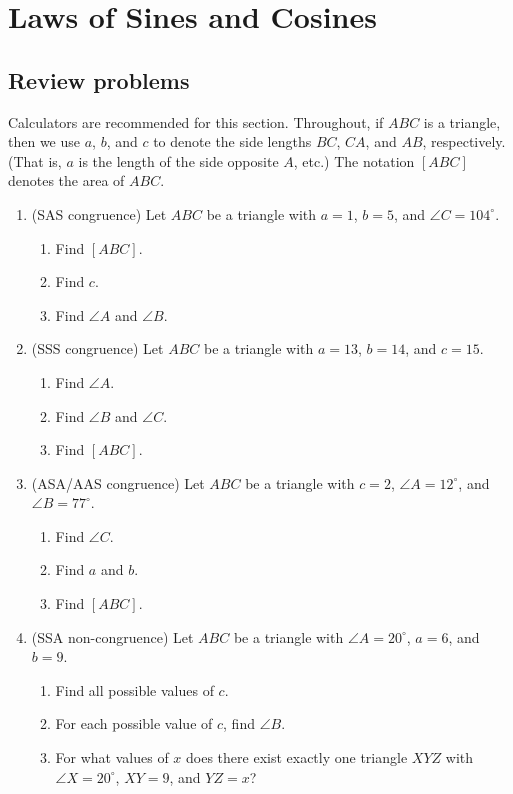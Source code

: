 \section{Laws of Sines and Cosines}

\subsection{Review problems}

Calculators are recommended for this section. Throughout, if $ABC$ is a triangle, then we use $a$, $b$, and $c$ to denote the side lengths $BC$, $CA$, and $AB$, respectively. (That is, $a$ is the length of the side opposite $A$, etc.) The notation $[ABC]$ denotes the area of $ABC$.

\begin{enumerate}
\item (SAS congruence) Let $ABC$ be a triangle with $a = 1$, $b = 5$, and $\angle C = 104^{\circ}$.
\begin{enumerate}
\item Find $[ABC]$.
\item Find $c$.
\item Find $\angle A$ and $\angle B$.
\end{enumerate}
\item (SSS congruence) Let $ABC$ be a triangle with $a = 13$, $b = 14$, and $c = 15$.
\begin{enumerate}
\item Find $\angle A$.
\item Find $\angle B$ and $\angle C$.
\item Find $[ABC]$.
\end{enumerate}
\item (ASA/AAS congruence) Let $ABC$ be a triangle with $c = 2$, $\angle A = 12^{\circ}$, and $\angle B = 77^{\circ}$.
\begin{enumerate}
\item Find $\angle C$.
\item Find $a$ and $b$.
\item Find $[ABC]$.
\end{enumerate}
\item (SSA non-congruence) Let $ABC$ be a triangle with $\angle A = 20^{\circ}$, $a = 6$, and $b = 9$.
\begin{enumerate}
\item Find all possible values of $c$.
\item For each possible value of $c$, find $\angle B$.
\item For what values of $x$ does there exist exactly one triangle $XYZ$ with $\angle X = 20^{\circ}$, $XY = 9$, and $YZ = x$?

\end{enumerate}
\end{enumerate}
